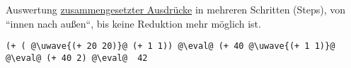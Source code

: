 Auswertung \underline{zusammengesetzter Ausdr\"ucke} in mehreren Schritten (Steps), von ``innen nach au\ss en``, bis keine Reduktion mehr m\"oglich ist.\\
\begin{lstlisting}
(+ ( @\uwave{(+ 20 20)}@ (+ 1 1)) @\eval@ (+ 40 @\uwave{(+ 1 1)}@ @\eval@ (+ 40 2) @\eval@  42 
\end{lstlisting}
\begin{mdframed}
\begin{SCodeFlow}\begin{RktBlk}\begin{SingleColumn}\RktCmt{;}\RktCmt{~}

\RktPn{(}\RktSym{+}\mbox{}

\mbox{}\RktPn{(}\RktSym{\mbox{{-}}}\mbox{}\RktPn{(}\RktSym{/}\mbox{}\mbox{}\RktPn{)}

\mbox{}\RktPn{(}\RktSym{/}\mbox{}\mbox{}\RktPn{)}\RktPn{)}\RktPn{)}

\mbox{}

\RktPn{(}\RktSym{\mbox{{-}}}\mbox{}\RktPn{(}\RktSym{+}\mbox{}

\mbox{}\RktPn{(}\RktSym{/}\mbox{}\mbox{}\RktPn{)}\RktPn{)}

\mbox{}\RktPn{(}\RktSym{/}\mbox{}\mbox{}\RktPn{)}\RktPn{)}

\mbox{}

\RktCmt{;}\RktCmt{~}

\RktPn{(}\RktSym{\mbox{{-}}}\mbox{}\RktPn{(}\RktSym{+}\mbox{}

\mbox{}\RktPn{(}\RktSym{/}\mbox{}\mbox{}\RktPn{)}\RktPn{)}

\mbox{}\RktPn{(}\RktSym{/}\mbox{}\mbox{}\RktPn{)}\RktPn{)}\end{SingleColumn}\end{RktBlk}\end{SCodeFlow}
\end{mdframed}
